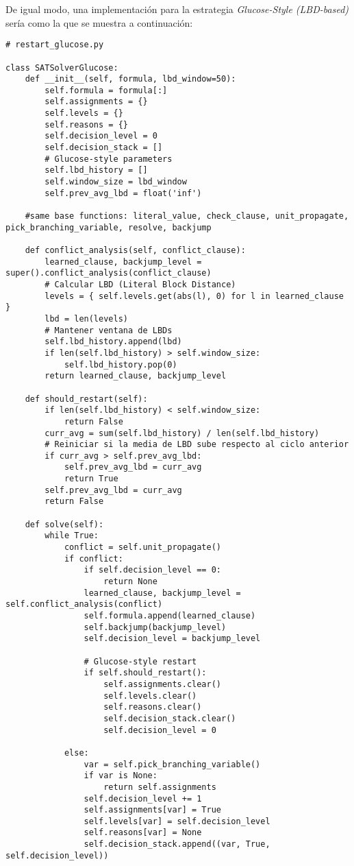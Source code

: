 De igual modo, una implementación para la estrategia \textit{Glucose-Style (LBD-based)} sería como la que se muestra a continuación:

\begin{lstlisting}
# restart_glucose.py

class SATSolverGlucose:
    def __init__(self, formula, lbd_window=50):
        self.formula = formula[:]  
        self.assignments = {}
        self.levels = {}
        self.reasons = {}
        self.decision_level = 0
        self.decision_stack = []
        # Glucose-style parameters
        self.lbd_history = []
        self.window_size = lbd_window
        self.prev_avg_lbd = float('inf')

    #same base functions: literal_value, check_clause, unit_propagate, pick_branching_variable, resolve, backjump

    def conflict_analysis(self, conflict_clause):
        learned_clause, backjump_level = super().conflict_analysis(conflict_clause)
        # Calcular LBD (Literal Block Distance)
        levels = { self.levels.get(abs(l), 0) for l in learned_clause }
        lbd = len(levels)
        # Mantener ventana de LBDs
        self.lbd_history.append(lbd)
        if len(self.lbd_history) > self.window_size:
            self.lbd_history.pop(0)
        return learned_clause, backjump_level

    def should_restart(self):
        if len(self.lbd_history) < self.window_size:
            return False
        curr_avg = sum(self.lbd_history) / len(self.lbd_history)
        # Reiniciar si la media de LBD sube respecto al ciclo anterior
        if curr_avg > self.prev_avg_lbd:
            self.prev_avg_lbd = curr_avg
            return True
        self.prev_avg_lbd = curr_avg
        return False

    def solve(self):
        while True:
            conflict = self.unit_propagate()
            if conflict:
                if self.decision_level == 0:
                    return None
                learned_clause, backjump_level = self.conflict_analysis(conflict)
                self.formula.append(learned_clause)
                self.backjump(backjump_level)
                self.decision_level = backjump_level

                # Glucose-style restart
                if self.should_restart():
                    self.assignments.clear()
                    self.levels.clear()
                    self.reasons.clear()
                    self.decision_stack.clear()
                    self.decision_level = 0

            else:
                var = self.pick_branching_variable()
                if var is None:
                    return self.assignments
                self.decision_level += 1
                self.assignments[var] = True
                self.levels[var] = self.decision_level
                self.reasons[var] = None
                self.decision_stack.append((var, True, self.decision_level))

\end{lstlisting}



